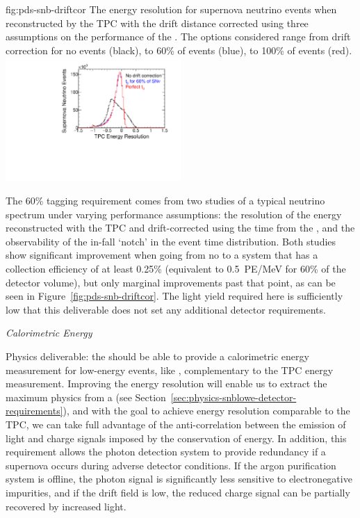 \begin{dunefigure}
{fig:pds-snb-driftcor}
{The energy resolution for supernova neutrino events when reconstructed by the TPC with the drift distance corrected using three assumptions on the performance of the . The options considered range from drift correction for no events (black), to 60\% of events (blue), to 100\% of events (red).
}
  \includegraphics[width=0.5\textwidth]{graphics/pds-snb-drift-corr}
 \end{dunefigure}

The 60\% \tzero tagging requirement comes from two studies of a typical  neutrino spectrum under varying  performance assumptions: the resolution of the energy reconstructed with the TPC and drift-corrected using the time from the , and the observability of the in-fall `notch' in the  event time distribution. Both studies show significant improvement when going from no  to a system that has a collection efficiency of at least 0.25\% (equivalent to \SI{0.5}{PE/MeV} for 60\% of the detector volume), but only marginal improvements past that point, as can be seen in Figure~\ref{fig:pds-snb-driftcor}. The light yield required here is sufficiently low that this deliverable does not set any additional detector requirements.


\textit{Calorimetric Energy}\nopagebreak

Physics deliverable: the  should be able to provide a calorimetric energy measurement for low-energy events, like , complementary to the TPC energy measurement. 
Improving the energy resolution will enable us to extract the maximum physics from a  (see Section~\ref{sec:physics-snblowe-detector-requirements}), and with the goal to achieve energy resolution comparable to the TPC, we can take full advantage of the anti-correlation between the emission of light and charge signals imposed by the conservation of energy. In addition, this requirement allows the photon detection system to provide redundancy if a supernova occurs during adverse detector conditions. If the argon purification system is offline, the photon signal is significantly less sensitive to electronegative impurities, and if the drift field is low, the reduced charge signal can be partially recovered by increased light.

